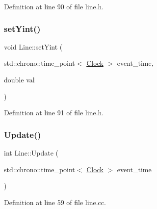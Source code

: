 Definition at line 90 of file line.\+h.

\mbox{\label{class_line_ad966eb3f1bd4cb29976b3e97811c344f}} 
\subsubsection{\texorpdfstring{set\+Yint()}{setYint()}}
{\footnotesize\ttfamily void Line\+::set\+Yint (\begin{DoxyParamCaption}\item[{std\+::chrono\+::time\+\_\+point$<$ \hyperlink{universe_8h_a0ef8d951d1ca5ab3cfaf7ab4c7a6fd80}{Clock} $>$}]{event\+\_\+time,  }\item[{double}]{val }\end{DoxyParamCaption})\hspace{0.3cm}{\ttfamily [inline]}}



Definition at line 91 of file line.\+h.

\mbox{\label{class_line_a8c6dece66f5cd93ce40134002a40f505}} 
\subsubsection{\texorpdfstring{Update()}{Update()}}
{\footnotesize\ttfamily int Line\+::\+Update (\begin{DoxyParamCaption}\item[{std\+::chrono\+::time\+\_\+point$<$ \hyperlink{universe_8h_a0ef8d951d1ca5ab3cfaf7ab4c7a6fd80}{Clock} $>$}]{event\+\_\+time }\end{DoxyParamCaption})}



Definition at line 59 of file line.\+cc.

